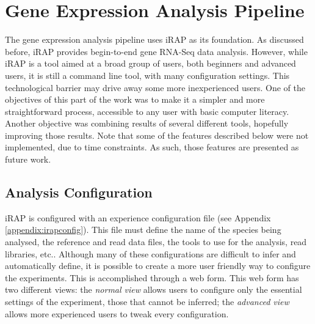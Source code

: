 \section{Gene Expression Analysis Pipeline}


The gene expression analysis pipeline uses iRAP as its foundation. As discussed
before, iRAP provides begin-to-end gene RNA-Seq data analysis. However, while
iRAP is a tool aimed at a broad group of users, both beginners and advanced
users, it is still a command line tool, with many configuration settings. This
technological barrier may drive away some more inexperienced users. One of the
objectives of this part of the work was to make it a simpler and more
straightforward process, accessible to any user with basic computer literacy.
Another objective was combining results of several different tools, hopefully
improving those results. Note that some of the features described below were not
implemented, due to time constraints. As such, those features are presented as
future work.

\subsection{Analysis Configuration}

iRAP is configured with an experience configuration file (see Appendix
\ref{appendix:irapconfig}). This file must define the name of the species being
analysed, the reference and read data files, the tools to use for the analysis,
read libraries, etc.. Although many of these configurations are difficult to
infer and automatically define, it is possible to create a more user friendly
way to configure the experiments. This is accomplished through a web form. This
web form has two different views: the \emph{normal view} allows users to
configure only the essential settings of the experiment, those that cannot be
inferred; the \emph{advanced view} allows more experienced users to tweak every
configuration.

